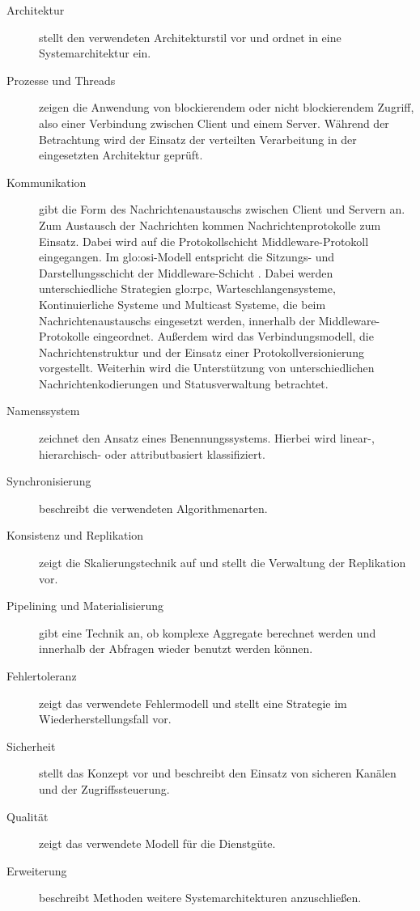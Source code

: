 \begin{description}
	\item[Architektur] stellt den verwendeten Architekturstil vor und ordnet in eine Systemarchitektur ein.
	\item[Prozesse und Threads] zeigen die Anwendung von blockierendem oder nicht blockierendem Zugriff, also einer Verbindung zwischen Client und einem Server. Während der Betrachtung wird der Einsatz der verteilten Verarbeitung in der eingesetzten Architektur geprüft.
	\item[Kommunikation] gibt die Form des Nachrichtenaustauschs zwischen Client und Servern an. Zum Austausch der Nachrichten kommen Nachrichtenprotokolle zum Einsatz. Dabei wird auf die Protokollschicht Middleware-Protokoll eingegangen. Im \acrshort{glo:osi}-Modell entspricht die Sitzungs- und Darstellungsschicht der Middleware-Schicht . Dabei werden unterschiedliche Strategien \gls{glo:rpc}, Warteschlangensysteme, Kontinuierliche Systeme und Multicast Systeme, die beim Nachrichtenaustauschs eingesetzt werden, innerhalb der Middleware-Protokolle eingeordnet. Außerdem wird das Verbindungsmodell, die Nachrichtenstruktur und der Einsatz einer Protokollversionierung vorgestellt. Weiterhin wird die Unterstützung von unterschiedlichen Nachrichtenkodierungen und Statusverwaltung betrachtet.
	\item[Namenssystem] zeichnet den Ansatz eines Benennungssystems. Hierbei wird linear-, hierarchisch- oder attributbasiert klassifiziert.
	\item[Synchronisierung] beschreibt die verwendeten Algorithmenarten. 
	\item[Konsistenz und Replikation] zeigt die Skalierungstechnik auf und stellt die Verwaltung der Replikation vor. 
	\item[Pipelining und Materialisierung] gibt eine Technik an, ob komplexe Aggregate berechnet werden und innerhalb der Abfragen wieder benutzt werden können.
	\item[Fehlertoleranz] zeigt das verwendete Fehlermodell und stellt eine Strategie im Wiederherstellungsfall vor.
	\item[Sicherheit] stellt das Konzept vor und beschreibt den Einsatz von sicheren Kanälen und der Zugriffssteuerung.
	\item[Qualität] zeigt das verwendete Modell für die Dienstgüte.
	\item[Erweiterung] beschreibt Methoden weitere Systemarchitekturen anzuschließen.
\end{description}

